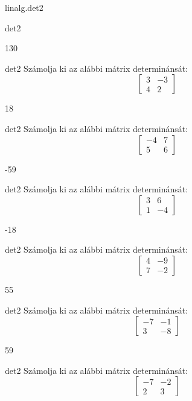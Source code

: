 \documentclass[12pt]{article}
\begin{document}
\begin{quiz}{linalg.det2}
\begin{numerical}{det2}
\item 130
\end{numerical}


\begin{numerical}{det2}
Számolja ki az alábbi mátrix determinánsát:
$$\left[\begin{array}{cc}3& -3\\ 4& 2\end{array}\right]$$

\item 18
\end{numerical}


\begin{numerical}{det2}
Számolja ki az alábbi mátrix determinánsát:
$$\left[\begin{array}{cc}-4& 7\\ 5& 6\end{array}\right]$$

\item -59
\end{numerical}


\begin{numerical}{det2}
Számolja ki az alábbi mátrix determinánsát:
$$\left[\begin{array}{cc}3& 6\\ 1& -4\end{array}\right]$$

\item -18
\end{numerical}


\begin{numerical}{det2}
Számolja ki az alábbi mátrix determinánsát:
$$\left[\begin{array}{cc}4& -9\\ 7& -2\end{array}\right]$$

\item 55
\end{numerical}


\begin{numerical}{det2}
Számolja ki az alábbi mátrix determinánsát:
$$\left[\begin{array}{cc}-7& -1\\ 3& -8\end{array}\right]$$

\item 59
\end{numerical}


\begin{numerical}{det2}
Számolja ki az alábbi mátrix determinánsát:
$$\left[\begin{array}{cc}-7& -2\\ 2& 3\end{array}\right]$$


\end{numerical}
\end{quiz}
\end{document}

